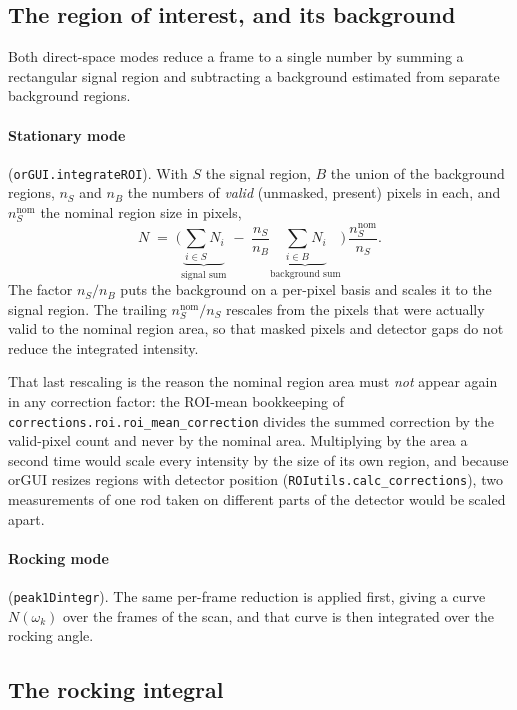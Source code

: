 \documentclass[11pt,a4paper]{article}
\newcommand{\code}[1]{\texttt{\small #1}}
\begin{document}
\subsection{The region of interest, and its background}

Both direct-space modes reduce a frame to a single number by summing a
rectangular signal region and subtracting a background estimated from
separate background regions.

\paragraph{Stationary mode} (\code{orGUI.integrateROI}). With $S$ the signal
region, $B$ the union of the background regions, $n_S$ and $n_B$ the numbers
of \emph{valid} (unmasked, present) pixels in each, and $n_S^{\mathrm{nom}}$
the nominal region size in pixels,
\begin{equation}
  N \;=\; \Biggl(\underbrace{\sum_{i\in S} N_i}_{\text{signal sum}}
        \;-\; \frac{n_S}{n_B}\underbrace{\sum_{i\in B} N_i}_{\text{background sum}}
    \Biggr)\,
    \frac{n_S^{\mathrm{nom}}}{n_S} .
  \label{eq:stationary_roi}
\end{equation}
The factor $n_S/n_B$ puts the background on a per-pixel basis and scales it to
the signal region. The trailing $n_S^{\mathrm{nom}}/n_S$ rescales from the
pixels that were actually valid to the nominal region area, so that masked
pixels and detector gaps do not reduce the integrated intensity.

That last rescaling is the reason the nominal region area must \emph{not}
appear again in any correction factor: the ROI-mean bookkeeping of
\code{corrections.roi.roi\_mean\_correction} divides the summed correction by
the valid-pixel count and never by the nominal area. Multiplying by the area a
second time would scale every intensity by the size of its own region, and
because orGUI resizes regions with detector position
(\code{ROIutils.calc\_corrections}), two measurements of one rod taken on
different parts of the detector would be scaled apart.

\paragraph{Rocking mode} (\code{peak1Dintegr}). The same per-frame reduction is
applied first, giving a curve $N(\omega_k)$ over the frames of the scan, and
that curve is then integrated over the rocking angle.

\subsection{The rocking integral}
\label{sec:rockinginterval}
\end{document}
